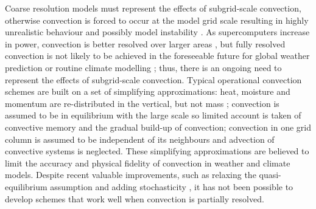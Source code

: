 \documentclass[11pt,a4paper]{article}
\begin{document}

Coarse resolution models must represent the effects of subgrid-scale convection, otherwise convection is forced to occur at the model grid scale resulting in highly unrealistic behaviour and possibly model instability \cite[]{PY15}.
As supercomputers increase in power, convection is better resolved over larger areas \cite[e.g.][]{GC17}, but fully resolved convection is not likely to be achieved in the foreseeable future for global weather prediction or routine climate modelling \cite[e.g.][]{SSJ+19}; thus, there is an ongoing need to represent the effects of subgrid-scale convection.
Typical operational convection schemes are built on a set of simplifying approximations:
heat, moisture and momentum are re-distributed in the vertical, but not mass \cite[]{Tied89,GR90}; convection is assumed to be in equilibrium with the large scale so limited account is taken of convective memory and the gradual build-up of convection; convection in one grid column is assumed to be independent of its neighbours and advection of convective systems is neglected. These simplifying approximations are believed to limit the accuracy and physical fidelity of
convection in weather and climate models. Despite recent valuable improvements, such as relaxing the quasi-equilibrium assumption \cite[]{PR98,GG05,Par14} and adding stochasticity \cite[]{PC08}, it has not been possible to develop schemes that work well when convection is partially resolved.
\end{document}
